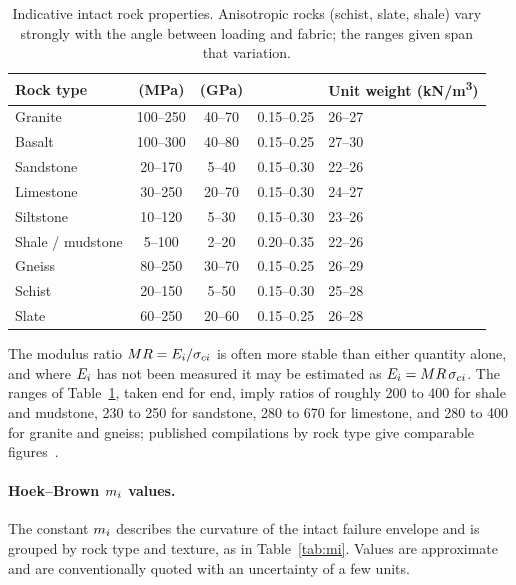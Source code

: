 \begin{table}[htbp]
\caption{Indicative intact rock properties. Anisotropic rocks
(schist, slate, shale) vary strongly with the angle between loading and
fabric; the ranges given span that variation.}
\label{tab:intact-props}
\centering
\small
\begin{tabularx}{\textwidth}{l c c c X}
\toprule
\textbf{Rock type} & \boldmath{$\sci$} \textbf{(MPa)} & \boldmath{$\Ei$}
\textbf{(GPa)} & \boldmath{$\nu$} & \textbf{Unit weight (kN/m\textsuperscript{3})} \\
\midrule
Granite            & 100--250 & 40--70 & 0.15--0.25 & 26--27 \\
Basalt             & 100--300 & 40--80 & 0.15--0.25 & 27--30 \\
Sandstone          & 20--170  & 5--40  & 0.15--0.30 & 22--26 \\
Limestone          & 30--250  & 20--70 & 0.15--0.30 & 24--27 \\
Siltstone          & 10--120  & 5--30  & 0.15--0.30 & 23--26 \\
Shale / mudstone   & 5--100   & 2--20  & 0.20--0.35 & 22--26 \\
Gneiss             & 80--250  & 30--70 & 0.15--0.25 & 26--29 \\
Schist             & 20--150  & 5--50  & 0.15--0.30 & 25--28 \\
Slate              & 60--250  & 20--60 & 0.15--0.25 & 26--28 \\
\bottomrule
\end{tabularx}
\end{table}

The modulus ratio $MR = E_i/\sigma_{ci}$ is often more stable than either quantity
alone, and where $\Ei$ has not been measured it may be estimated as
$E_i = MR\,\sigma_{ci}$. The ranges of Table~\ref{tab:intact-props}, taken end for
end, imply ratios of roughly 200 to 400 for shale and mudstone, 230 to 250
for sandstone, 280 to 670 for limestone, and 280 to 400 for granite and
gneiss; published compilations by rock type give comparable
figures~\citep{hoekdiederichs2006}.

\paragraph{Hoek--Brown $m_i$ values.}
The constant $m_i$ describes the curvature of the intact failure envelope and
is grouped by rock type and texture, as in Table~\ref{tab:mi}. Values are
approximate and are conventionally quoted with an uncertainty of a few units.

